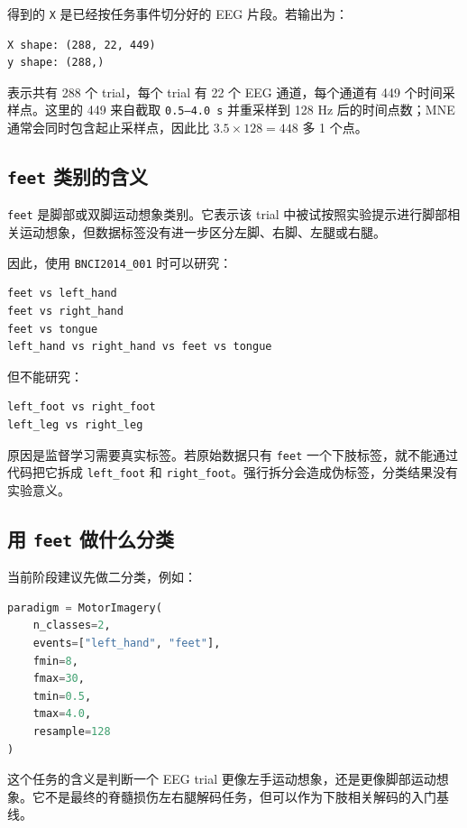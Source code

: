 \documentclass[UTF8,a4paper,12pt]{ctexart}
\begin{document}
得到的 \texttt{X} 是已经按任务事件切分好的 EEG 片段。若输出为：

\begin{lstlisting}[language={}]
X shape: (288, 22, 449)
y shape: (288,)
\end{lstlisting}

表示共有 288 个 trial，每个 trial 有 22 个 EEG 通道，每个通道有 449 个时间采样点。这里的 449 来自截取 \texttt{0.5--4.0 s} 并重采样到 128 Hz 后的时间点数；MNE 通常会同时包含起止采样点，因此比 \(3.5 \times 128 = 448\) 多 1 个点。

\subsection{\texttt{feet} 类别的含义}

\texttt{feet} 是脚部或双脚运动想象类别。它表示该 trial 中被试按照实验提示进行脚部相关运动想象，但数据标签没有进一步区分左脚、右脚、左腿或右腿。

因此，使用 \texttt{BNCI2014\_001} 时可以研究：

\begin{lstlisting}[language={}]
feet vs left_hand
feet vs right_hand
feet vs tongue
left_hand vs right_hand vs feet vs tongue
\end{lstlisting}

但不能研究：

\begin{lstlisting}[language={}]
left_foot vs right_foot
left_leg vs right_leg
\end{lstlisting}

原因是监督学习需要真实标签。若原始数据只有 \texttt{feet} 一个下肢标签，就不能通过代码把它拆成 \texttt{left\_foot} 和 \texttt{right\_foot}。强行拆分会造成伪标签，分类结果没有实验意义。

\subsection{用 \texttt{feet} 做什么分类}

当前阶段建议先做二分类，例如：

\begin{lstlisting}[language=Python,caption={提取 \texttt{left\_hand} vs \texttt{feet} 数据}]
paradigm = MotorImagery(
    n_classes=2,
    events=["left_hand", "feet"],
    fmin=8,
    fmax=30,
    tmin=0.5,
    tmax=4.0,
    resample=128
)
\end{lstlisting}

这个任务的含义是判断一个 EEG trial 更像左手运动想象，还是更像脚部运动想象。它不是最终的脊髓损伤左右腿解码任务，但可以作为下肢相关解码的入门基线。
\end{document}
